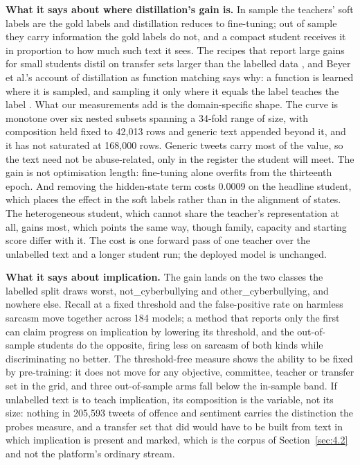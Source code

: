 \textbf{What it says about where distillation's gain is.} In sample the teachers' soft labels are
the gold labels and distillation reduces to fine-tuning; out of sample they carry information the
gold labels do not, and a compact student receives it in proportion to how much such text it sees.
The recipes that report large gains for small students distil on transfer sets larger than the
labelled data \cite{tang2019distilling, jiao2020tinybert, turc2019wellread}, and Beyer et al.'s
account of distillation as function matching says why: a function is learned where it is sampled,
and sampling it only where it equals the label teaches the label \cite{beyer2022knowledge}. What our
measurements add is the domain-specific shape. The curve is monotone over six nested subsets
spanning a 34-fold range of size, with composition held fixed to 42,013 rows and generic text
appended beyond it, and it has not saturated at 168,000 rows. Generic tweets carry most of the
value, so the text need not be abuse-related, only in the register the student will meet. The gain
is not optimisation length: fine-tuning alone overfits from the thirteenth epoch. And removing the
hidden-state term costs 0.0009 on the headline student, which places the effect in the soft labels
rather than in the alignment of states. The heterogeneous student, which cannot share the teacher's
representation at all, gains most, which points the same way, though family, capacity and starting
score differ with it. The cost is one forward pass of one teacher over the unlabelled text and a
longer student run; the deployed model is unchanged.

\textbf{What it says about implication.} The gain lands on the two classes the labelled split draws
worst, not\_cyberbullying and other\_cyberbullying, and nowhere else. Recall at a fixed threshold
and the false-positive rate on harmless sarcasm move together across 184 models; a method that
reports only the first can claim progress on implication by lowering its threshold, and the
out-of-sample students do the opposite, firing less on sarcasm of both kinds while discriminating no
better. The threshold-free measure shows the ability to be fixed by pre-training: it does not move
for any objective, committee, teacher or transfer set in the grid, and three out-of-sample arms fall
below the in-sample band. If unlabelled text is to teach implication, its composition is the
variable, not its size: nothing in 205,593 tweets of offence and sentiment carries the distinction
the probes measure, and a transfer set that did would have to be built from text in which
implication is present and marked, which is the corpus of Section~\ref{sec:4.2} and not the
platform's ordinary stream.

